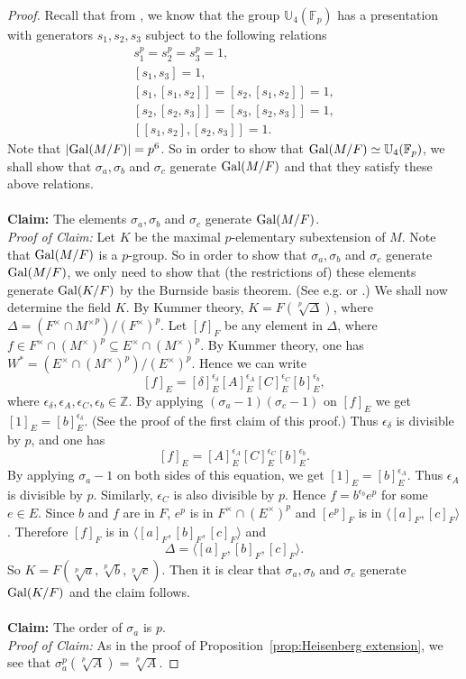 \documentclass[12pt,leqno]{amsart}
\theoremstyle{plain}
\theoremstyle{definition}
\newcommand{\Gal}{{\rm Gal}}
\newcommand{\F}{{\mathbb F}}
\newcommand{\U}{{\mathbb U}}
\newcommand{\Z}{{\mathbb Z}}
\begin{document}
\begin{proof}
Recall that from \cite[Theorem 1]{BD}, we know that the group $\U_4(\F_p)$ has a presentation with generators $s_1,s_2,s_3$ subject to the following relations
\[
\label{eq:R}
\tag{R}
\begin{aligned}
s_1^p=s_2^p=s_3^p=1,\\
[s_1,s_3]=1,\\
[s_1,[s_1,s_2]]=[s_2,[s_1,s_2]]=1,\\
[s_2,[s_2,s_3]]=[s_3,[s_2,s_3]]=1,\\
[[s_1,s_2],[s_2,s_3]]=1.
\end{aligned}
\]
Note that  $|\Gal(M/F)|=p^6$.
So in order to show that $\Gal(M/F)\simeq \U_4(\F_p)$, we shall show that $\sigma_a,\sigma_b$ and $\sigma_c$ generate $\Gal(M/F)$ and that they satisfy these above relations.
\\
\\
{\bf Claim:} The elements $\sigma_a,\sigma_b$ and $\sigma_c$ generate $\Gal(M/F)$.\\
{\it Proof of Claim:} Let $K$ be the maximal $p$-elementary subextension of $M$. Note that $\Gal(M/F)$ is a $p$-group. So in order to show that $\sigma_a,\sigma_b$ and $\sigma_c$ generate $\Gal(M/F)$, we only need to show that (the restrictions of) these elements generate $\Gal(K/F)$ by the Burnside basis theorem. (See e.g. \cite[Theorem 12.2.1]{Ha} or \cite[Theorem 4.10]{Ko}.)
 We shall now determine the field $K$.
By Kummer theory, $K=F(\sqrt[p]{\Delta})$, where $\Delta= (F^\times\cap {M^\times}^p)/(F^\times)^p$. 
Let $[f]_F$ be any element in $\Delta$, where $f\in F^\times \cap (M^\times)^p\subseteq E^\times \cap  (M^\times)^p$. 
By Kummer theory, one has
$
W^*=(E^\times \cap (M^\times)^p)/(E^\times)^p. 
$ 
Hence we can write
\[
[f]_E=[\delta]_E^{\epsilon_\delta} [A]_E^{\epsilon_A} [C]_E^{\epsilon_C} [b]_E^{\epsilon_b},
\]
where $\epsilon_\delta,\epsilon_A,\epsilon_C,\epsilon_b\in \Z$. By applying $(\sigma_a-1)(\sigma_c-1)$ on $[f]_E$ we get
$
[1]_E=[b]_E^{\epsilon_\delta}.
$
(See the proof of the first claim of this proof.)
Thus $\epsilon_\delta $ is divisible by $p$, and one has 
\[
[f]_E=[A]_E^{\epsilon_A} [C]_E^{\epsilon_C} [b]_E^{\epsilon_b}.
\]  
By applying $\sigma_a-1$ on both sides of this equation, we get
$
[1]_E=[b]_E^{\epsilon_A}.
$
Thus $\epsilon_A$ is divisible by $p$.  Similarly, $\epsilon_C$ is also divisible by $p$. Hence $f=b^{\epsilon_b}e^p$ for some $e\in E$. Since $b$ and $f$ are in $F$, $e^p$ is in $F^\times \cap (E^\times)^p$ and $[e^p]_F$ is in $\langle [a]_F,[c]_F\rangle$. Therefore $[f]_F$ is in $\langle [a]_F,[b]_F,[c]_F\rangle$ and 
\[
\Delta= \langle [a]_F,[b]_F,[c]_F\rangle.
\]
So $K=F(\sqrt[p]{a},\sqrt[p]{b},\sqrt[p]{c})$. Then it is clear that $\sigma_a,\sigma_b$ and $\sigma_c$ generate $\Gal(K/F)$ and the claim follows.
\\
\\
{\bf Claim:} The order of $\sigma_a$ is $p$.\\
{\it Proof of Claim:}
As in the proof of Proposition~\ref{prop:Heisenberg extension}, we see that $\sigma_a^p(\sqrt[p]{A})=\sqrt[p]{A}$.


\end{proof}
\end{document}
